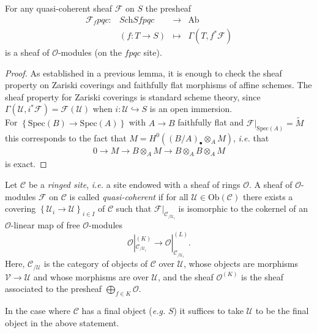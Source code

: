 \begin{proposition} For any quasi-coherent sheaf $\mathcal{F}$ on $S$ the presheaf
$$
\begin{array}{rccl}
\mathcal{F}_fpqc : & \textit{Sch}Sfpqc & \to & \text{Ab}\\ 
& (f: T \to S) &\mapsto & \Gamma(T, f^*\mathcal{F})
\end{array}
$$
  is a sheaf of $\mathcal{O}$-modules (on the $fpqc$ site). 
\end{proposition}
\begin{proof}
  As established in a previous lemma, it is enough to check the sheaf property on Zariski coverings and faithfully flat morphisms of affine schemes.  The sheaf property for Zariski coverings is standard scheme theory, since $\Gamma(\mathcal{U}, i^\ast \mathcal{F}) = \mathcal{F}(\mathcal{U})$ when $i: \mathcal{U} \hookrightarrow S$ is an open immersion. 
  \\
  For $\left\{\text{Spec}(B)\to \text{Spec}(A)\right\}$ with $A\to B$ faithfully
  flat and 
  $\mathcal{F}|_{\text{Spec}(A)} = \widetilde{M}$ 
  this corresponds to the fact that
  $M=H^0\left((B/A)_\bullet\otimes_AM \right)$, {\it i.e.} that
  \begin{align*}
0 \to M \to B\otimes_A M \to B\otimes_A B \otimes_A M
\end{align*}
is exact.
\end{proof}

  \begin{definition}
    Let $\mathcal{C}$ be a \emph{ringed site}, {\it i.e.} a site endowed with a sheaf of rings $\mathcal{O}$. A sheaf of $\mathcal{O}$-modules $\mathcal{F}$ on $\mathcal{C}$ is called \emph{quasi-coherent} if for all $\mathcal{U}\in \text{Ob}(\mathcal{C})$ there exists a covering $\left\{\mathcal{U}_i \to \mathcal{U}\right\}_{i\in I}$ of $\mathcal{C}$ such that  $\mathcal{F}|_{\mathcal{C}_{/\mathcal{U}_i}}$ is isomorphic to the cokernel of an $\mathcal{O}$-linear map of free $\mathcal{O}$-modules $$\mathcal{O}|_{\mathcal{C}_{/\mathcal{U}_i}}^{(K)} \to \mathcal{O}|_{\mathcal{C}_{/\mathcal{U}_i}}^{(L)}.$$ Here, $\mathcal{C}_{/\mathcal{U}}$ is the category of objects of $\mathcal{C}$ over $\mathcal{U}$, whose objects are morphisms $\mathcal{V} \to \mathcal{U}$ and whose morphisms are over $\mathcal{U}$, and the sheaf $\mathcal{O}^{(K)}$ is the sheaf associated to the presheaf $\bigoplus_{f \in K} \mathcal{O}$. 
  \end{definition}
  
  \begin{remark}
  In the case where $\mathcal{C}$ has a final object ({\it e.g.} $S$) it suffices to take $\mathcal{U}$ to be the final object in the above statement.
  \end{remark}
  
